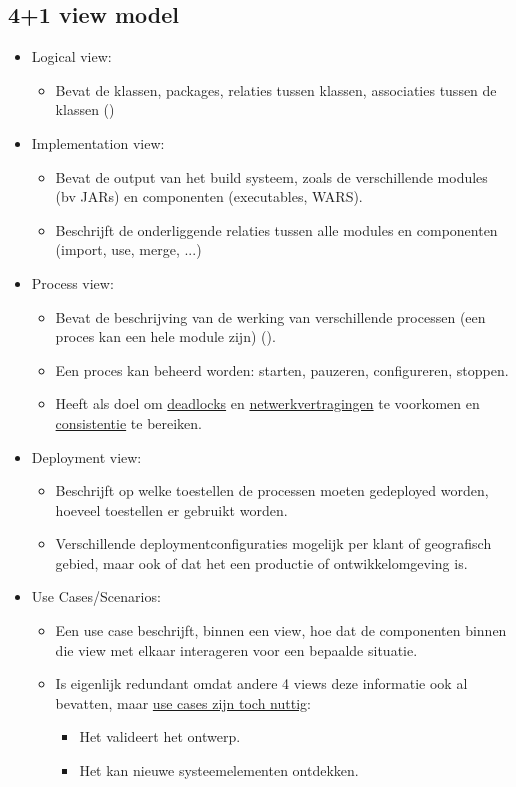 	\subsection{4+1 view model}
	\begin{itemize}
		\item[\info] Logical view:
			\begin{itemize}
				\item[\info] Bevat de klassen, packages, relaties tussen klassen, associaties tussen de klassen ()
			\end{itemize}
		\item[\info] Implementation view:
			\begin{itemize}
				\item[\info] Bevat de output van het build systeem, zoals de verschillende modules (bv JARs) en componenten (executables, WARS).
				\item[\info] Beschrijft de onderliggende relaties tussen alle modules en componenten (import, use, merge, ...)
			\end{itemize}
		\item[\info] Process view:
			\begin{itemize}
				\item[\info] Bevat de beschrijving van de werking van verschillende processen (een proces kan een hele module zijn) ().
				\item[\info] Een proces kan beheerd worden: starten, pauzeren, configureren, stoppen.
				\item[\info] Heeft als doel om \underline{deadlocks} en \underline{netwerkvertragingen} te voorkomen en \underline{consistentie} te bereiken. 
			\end{itemize}
		\item[\info] Deployment view:
			\begin{itemize}
				\item[\info] Beschrijft op welke toestellen de processen moeten gedeployed worden, hoeveel toestellen er gebruikt worden.
				\item[\info] Verschillende deploymentconfiguraties mogelijk per klant of geografisch gebied, maar ook of dat het een productie of ontwikkelomgeving is.
			\end{itemize}
		\item[\info]  Use Cases/Scenarios:
			\begin{itemize}
				\item[\info] Een use case beschrijft, binnen een view, hoe dat de componenten binnen die view met elkaar interageren voor een bepaalde situatie.
				\item[\info] Is eigenlijk redundant omdat andere 4 views deze informatie ook al bevatten, maar \underline{use cases zijn toch nuttig}:
				\begin{itemize}
					\item[\good] Het valideert het ontwerp.
					\item[\good] Het kan nieuwe systeemelementen ontdekken.
				\end{itemize}
			\end{itemize}
	\end{itemize}

